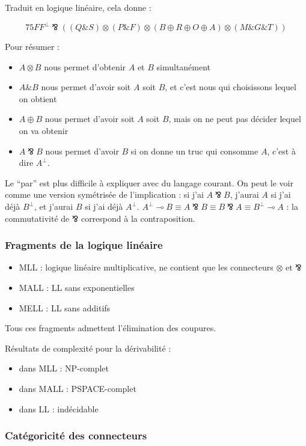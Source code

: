 \documentclass[a4paper, 11pt]{article}
\newcommand{\avec}{\mathbin{\&}}
\newcommand{\parr}{\mathbin{⅋}}
\begin{document}
Traduit en logique linéaire, cela donne :

$$75 FF^{\bot} \parr ((Q \avec S) \otimes (P \avec F) \otimes (B \oplus R \oplus O \oplus A) \otimes (M \avec G \avec T))$$ 

Pour résumer :
\begin{itemize}
    \item $A \otimes B$ nous permet d'obtenir $A$ et $B$ simultanément
    \item $A \avec B$ nous permet d'avoir soit $A$ soit $B$, et c'est nous qui choisissons lequel on obtient
    \item $A \oplus B$ nous permet d'avoir soit $A$ soit $B$, mais on ne peut pas décider lequel on va obtenir
    \item $A \parr B$ nous permet d'avoir $B$ si on donne un truc qui consomme $A$, c'est à dire $A^{\bot}$.
\end{itemize}

Le \enquote{par} est plus difficile à expliquer avec du langage courant. On peut le voir comme une version symétrisée de l'implication : si j'ai $A \parr B$, j'aurai $A$ si j'ai déjà $B^\perp$, et j'aurai $B$ si j'ai déjà $A^\perp$. $A^\perp \multimap B \equiv A \parr B \equiv B \parr A \equiv B^\perp \multimap A$ : la commutativité de $\parr$ correspond à la contraposition.

\subsubsection{Fragments de la logique linéaire}

\begin{itemize}
\item MLL : logique linéaire multiplicative, ne contient que les connecteurs $\otimes$ et $\parr$
\item MALL : LL sans exponentielles
\item MELL : LL sans additifs
\end{itemize}
Tous ces fragments admettent l'élimination des coupures.

Résultats de complexité pour la dérivabilité :
\begin{itemize}
\item dans MLL : NP-complet
\item dans MALL : PSPACE-complet
\item dans LL : indécidable %
\end{itemize}

\subsubsection{Catégoricité des connecteurs}
\end{document}
